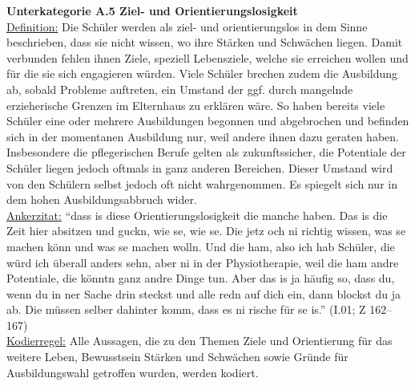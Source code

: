 \textbf{Unterkategorie A.5 Ziel- und Orientierungslosigkeit}\\
\underline{Definition:} Die Schüler werden als ziel- und orientierungslos in dem Sinne beschrieben, dass sie nicht wissen, wo ihre Stärken und Schwächen liegen. Damit verbunden fehlen ihnen Ziele, speziell Lebensziele, welche sie erreichen wollen und für die sie sich engagieren würden. Viele Schüler brechen zudem die Ausbildung ab, sobald Probleme auftreten, ein Umstand der ggf. durch mangelnde erzieherische Grenzen im Elternhaus zu erklären wäre. So haben bereits viele Schüler eine oder mehrere Ausbildungen begonnen und abgebrochen und befinden sich in der momentanen Ausbildung nur, weil andere ihnen dazu geraten haben. Insbesondere die pflegerischen Berufe gelten als zukunftssicher, die Potentiale der Schüler liegen jedoch oftmals in ganz anderen Bereichen. Dieser Umstand wird von den Schülern selbst jedoch oft nicht wahrgenommen. Es spiegelt sich nur in dem hohen Ausbildungsabbruch wider.\\
\underline{Ankerzitat:} "`dass is diese Orientierungslosigkeit die manche haben. Das is die Zeit hier absitzen und guckn, wie se, wie se. Die jetz och ni richtig wissen, was se machen könn und was se machen wolln. Und die ham, also ich hab Schüler, die würd ich überall anders sehn, aber ni in der Physiotherapie, weil die ham andre Potentiale, die könntn ganz andre Dinge tun. Aber das is ja häufig so, dass du, wenn du in ner Sache drin steckst und alle redn auf dich ein, dann blockst du ja ab. Die müssen selber dahinter komm, dass es ni rische für se is."' (I.01; Z 162--167)\\
\underline{Kodierregel:} Alle Aussagen, die zu den Themen Ziele und Orientierung für das weitere Leben, Bewusstsein Stärken und Schwächen sowie Gründe für Ausbildungswahl getroffen wurden, werden kodiert. \\

